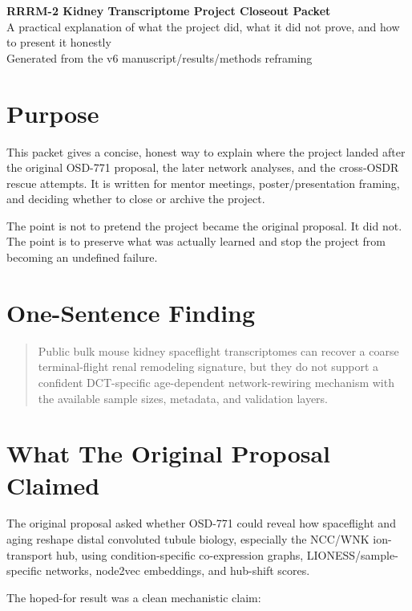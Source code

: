 \documentclass[11pt]{article}
\newcommand{\OSD}{OSDR}
\begin{document}
\begin{center}
{\LARGE \textbf{RRRM-2 Kidney Transcriptome Project Closeout Packet}}\\[0.5em]
{\large A practical explanation of what the project did, what it did not prove, and how to present it honestly}\\[0.75em]
{\small Generated from the v6 manuscript/results/methods reframing}
\end{center}

\section*{Purpose}

This packet gives a concise, honest way to explain where the project landed after the original OSD-771 proposal, the later network analyses, and the cross-\OSD{} rescue attempts. It is written for mentor meetings, poster/presentation framing, and deciding whether to close or archive the project.

The point is not to pretend the project became the original proposal. It did not. The point is to preserve what was actually learned and stop the project from becoming an undefined failure.

\section*{One-Sentence Finding}

\begin{quote}
Public bulk mouse kidney spaceflight transcriptomes can recover a coarse terminal-flight renal remodeling signature, but they do not support a confident DCT-specific age-dependent network-rewiring mechanism with the available sample sizes, metadata, and validation layers.
\end{quote}

\section*{What The Original Proposal Claimed}

The original proposal asked whether OSD-771 could reveal how spaceflight and aging reshape distal convoluted tubule biology, especially the NCC/WNK ion-transport hub, using condition-specific co-expression graphs, LIONESS/sample-specific networks, node2vec embeddings, and hub-shift scores.

The hoped-for result was a clean mechanistic claim:
\end{document}
